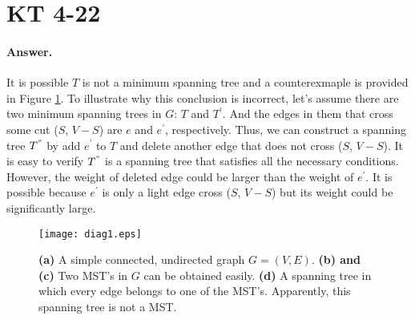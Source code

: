 \documentclass[paper=a4, fontsize=12pt]{scrartcl} %
\numberwithin{equation}{section} %
\numberwithin{figure}{section} %
\numberwithin{table}{section} %
\begin{document}
\section{KT 4-22}
\paragraph{Answer.} It is possible $T$ is not a minimum spanning tree  and a counterexmaple is provided in Figure \ref{fig:d1}. To illustrate why this conclusion is incorrect, let's assume there are two minimum spanning trees in $G$: $T$ and $T^{'}$. And the edges in them that cross some cut ($S$, $V-S$) are $e$ and $e^{'}$, respectively. Thus, we can construct a spanning tree $T^{"}$ by add $e^{'}$ to $T$ and delete another edge that does not cross ($S$, $V-S$). It is easy to verify $T^{"}$ is a spanning tree that satisfies all the necessary conditions. However, the weight of deleted edge could be larger than the weight of $e^{'}$. It is possible because $e^{'}$ is only a light edge cross ($S$, $V-S$) but its weight could be significantly large. 
\begin{figure}[h]
\centering
\texttt{[image: diag1.eps]}
\caption{\textbf{(a)} A simple connected, undirected graph $G=(V,E)$. \textbf{(b) and (c)} Two MST's in $G$ can be obtained easily. \textbf{(d)} A spanning tree in which every edge belongs to one of the MST's. Apparently, this spanning tree is not a MST.}
\label{fig:d1}
\end{figure}
\end{document}
